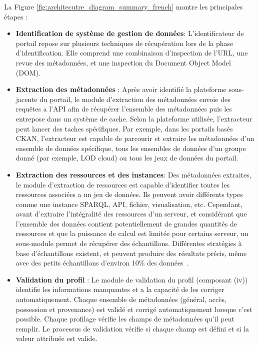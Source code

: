 La Figure \ref{fig:architecutre_diagram_summary_french} montre les principales \'{e}tapes :

\begin{itemize}
	\item \textbf{Identification de syst\`{e}me de gestion de donn\'{e}es}: L'identificateur de portail repose sur plusieurs techniques de r\'{e}cup\'{e}ration lors de la phase d'identification. Elle comprend une combinaison d'inspection de l'URL, une revue des m\'{e}tadonn\'{e}es, et une inspection du Document Object Model (DOM).
	\item \textbf{Extraction des m\'{e}tadonn\'{e}es} : Apr\`{e}s avoir identifi\'{e} la plateforme sous-jacente du portail, le module d'extraction des m\'{e}tadonn\'{e}es envoie des requêtes a l'API afin de r\'{e}cup\'{e}rer l’ensemble des m\'{e}tadonn\'{e}es puis les entrepose dans un syst\`{e}me de cache. Selon la plateforme utilis\'{e}e, l'extracteur peut lancer des taches sp\'{e}cifiques. Par exemple, dans les portails bas\'{e}s CKAN, l'extracteur est capable de parcourir et extraire les m\'{e}tadonn\'{e}es d'un ensemble de donn\'{e}es sp\'{e}cifique, tous les ensembles de donn\'{e}es d'un groupe donn\'{e} (par exemple, LOD cloud) ou tous les jeux de donn\'{e}es du portail.
	\item \textbf{Extraction des ressources et des instances}: Des m\'{e}tadonn\'{e}es extraites, le module d'extraction de ressources est capable d'identifier toutes les ressources associ\'{e}es a un jeu de donn\'{e}es. Ils peuvent avoir diff\'{e}rents types comme une instance SPARQL, API, fichier, visualisation, etc. Cependant, avant d'extraire l'int\'{e}gralit\'{e} des ressources d'un serveur, et consid\'{e}rant que l'ensemble des donn\'{e}es contient potentiellement de grandes quantit\'{e}s de ressources et que la puissance de calcul est limit\'{e}e pour certains serveur, un sous-module permet de r\'{e}cup\'{e}rer des \'{e}chantillons. Diff\'{e}rentes strat\'{e}gies à base d'\'{e}chantillons existent, et peuvent produire des r\'{e}sultats pr\'{e}cis, même avec des petits \'{e}chantillons d'environ 10\% des donn\'{e}es~\cite{Fetahu:ESWC:14}.
	\item \textbf{Validation du profil} : Le module de validation du profil (composant (iv)) identifie les informations manquantes et a la capacit\'{e} de les corriger automatiquement. Chaque ensemble de m\'{e}tadonn\'{e}es (g\'{e}n\'{e}ral, acc\`{e}s, possession et provenance) est valid\'{e} et corrig\'{e} automatiquement lorsque c'est possible. Chaque profilage v\'{e}rifie les champs de m\'{e}tadonn\'{e}es qu'il peut remplir. Le processus de validation v\'{e}rifie si chaque champ est d\'{e}fini et si la valeur attribu\'{e}e est valide.


\end{itemize}

